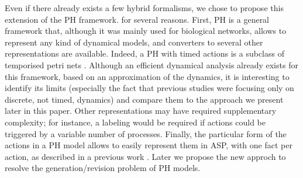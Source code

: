 Even if there already exists a few hybrid formalisms, we chose to propose this extension of the PH framework. for several reasons.
First, PH is a general framework that,
although it was mainly used for biological networks,
allows to represent any kind of dynamical models,
and converters to several other representations are available.
Indeed, a PH with timed actions is a subclass of temporised petri nets \cite{freedman1991time}.
Although an efficient dynamical analysis already exists for this framework,
based on an approximation of the dynamics,
it is interesting to identify its limits (especially the fact that previous studies were focusing only on discrete, not timed, dynamics)
and compare them to the approach we present later in this paper. Other representations may have required supplementary complexity;
for instance, a labeling would be required
if actions could be triggered by a variable number of processes.
Finally, the particular form of the actions in a  PH model allows
to easily represent them in ASP,
with one fact per action, as described in a previous work \cite{benabdallah2015}. Later we propose the new approch to resolve the generation/revision problem of PH models.

